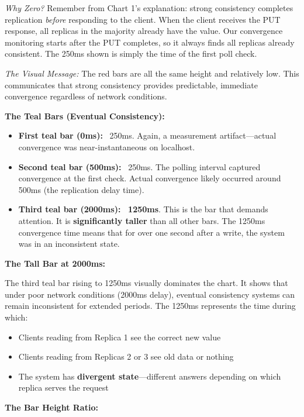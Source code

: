 \documentclass[10pt,a4paper]{article}
\begin{document}
\textit{Why Zero?} Remember from Chart 1's explanation: strong consistency completes replication \textit{before} responding to the client. When the client receives the PUT response, all replicas in the majority already have the value. Our convergence monitoring starts after the PUT completes, so it always finds all replicas already consistent. The 250ms shown is simply the time of the first poll check.

\textit{The Visual Message:} The red bars are all the same height and relatively low. This communicates that strong consistency provides predictable, immediate convergence regardless of network conditions.

\textbf{The Teal Bars (Eventual Consistency):}

\begin{itemize}
    \item \textbf{First teal bar (0ms):} ~250ms. Again, a measurement artifact---actual convergence was near-instantaneous on localhost.
    
    \item \textbf{Second teal bar (500ms):} ~250ms. The polling interval captured convergence at the first check. Actual convergence likely occurred around 500ms (the replication delay time).
    
    \item \textbf{Third teal bar (2000ms):} \textbf{~1250ms}. This is the bar that demands attention. It is \textbf{significantly taller} than all other bars. The 1250ms convergence time means that for over one second after a write, the system was in an inconsistent state.
\end{itemize}

\textbf{The Tall Bar at 2000ms:}

The third teal bar rising to 1250ms visually dominates the chart. It shows that under poor network conditions (2000ms delay), eventual consistency systems can remain inconsistent for extended periods. The 1250ms represents the time during which:
\begin{itemize}
    \item Clients reading from Replica 1 see the correct new value
    \item Clients reading from Replicas 2 or 3 see old data or nothing
    \item The system has \textbf{divergent state}---different answers depending on which replica serves the request
\end{itemize}

\textbf{The Bar Height Ratio:}
\end{document}
